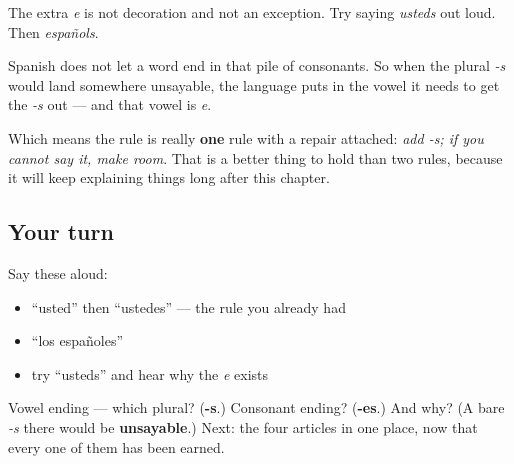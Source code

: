 \begin{culture}
The extra \emph{e} is not decoration and not an exception. Try saying \emph{usteds} out loud. Then \emph{españols}.

Spanish does not let a word end in that pile of consonants. So when the plural \emph{-s} would land somewhere unsayable, the language puts in the vowel it needs to get the \emph{-s} out — and that vowel is \emph{e}.

Which means the rule is really \textbf{one} rule with a repair attached: \emph{add -s; if you cannot say it, make room}. That is a better thing to hold than two rules, because it will keep explaining things long after this chapter.
\end{culture}

\subsection*{Your turn}
Say these aloud:

\begin{itemize}
\raggedright
  \item \textquotedblleft{}usted\textquotedblright{} then \textquotedblleft{}ustedes\textquotedblright{} — the rule you already had
  \item \textquotedblleft{}los españoles\textquotedblright{}
  \item try \textquotedblleft{}usteds\textquotedblright{} and hear why the \emph{e} exists
\end{itemize}

\begin{tcolorbox}[breakable,colback=teal!4,colframe=teal!35!black,title={Before you move on}]
Vowel ending — which plural? (\textbf{-s}.) Consonant ending? (\textbf{-es}.) And why? (A bare \emph{-s} there would be \textbf{unsayable}.) Next: the four articles in one place, now that every one of them has been earned.
\end{tcolorbox}
